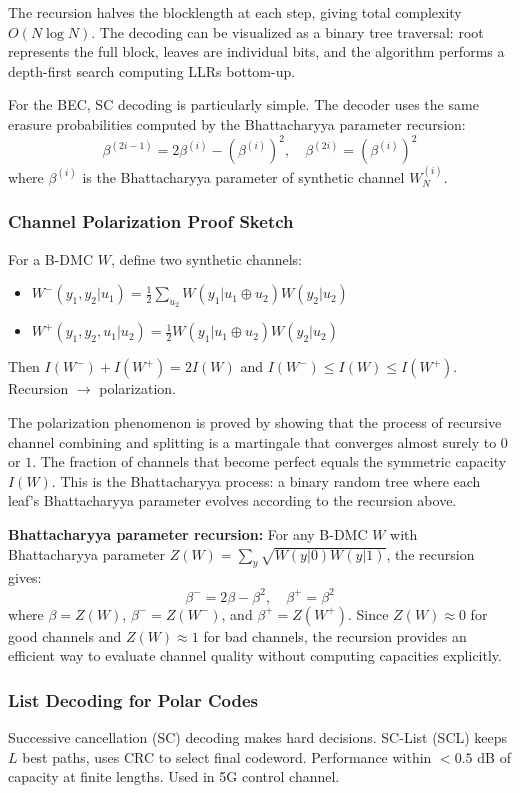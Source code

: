 The recursion halves the blocklength at each step, giving total complexity $O(N \log N)$. The decoding can be visualized as a binary tree traversal: root represents the full block, leaves are individual bits, and the algorithm performs a depth-first search computing LLRs bottom-up.

For the BEC, SC decoding is particularly simple. The decoder uses the same erasure probabilities computed by the Bhattacharyya parameter recursion:
\[
\beta^{(2i-1)} = 2\beta^{(i)} - (\beta^{(i)})^2,\quad
\beta^{(2i)} = (\beta^{(i)})^2
\]
where $\beta^{(i)}$ is the Bhattacharyya parameter of synthetic channel $W_N^{(i)}$.

\subsubsection*{Channel Polarization Proof Sketch}
For a B-DMC $W$, define two synthetic channels:
\begin{itemize}
\item $W^-(y_1,y_2|u_1) = \frac{1}{2} \sum_{u_2} W(y_1|u_1 \oplus u_2) W(y_2|u_2)$
\item $W^+(y_1,y_2,u_1|u_2) = \frac{1}{2} W(y_1|u_1 \oplus u_2) W(y_2|u_2)$
\end{itemize}
Then $I(W^-) + I(W^+) = 2I(W)$ and $I(W^-) \le I(W) \le I(W^+)$. Recursion $\to$ polarization.

The polarization phenomenon is proved by showing that the process of recursive channel combining and splitting is a martingale that converges almost surely to $0$ or $1$. The fraction of channels that become perfect equals the symmetric capacity $I(W)$. This is the Bhattacharyya process: a binary random tree where each leaf's Bhattacharyya parameter evolves according to the recursion above.

\textbf{Bhattacharyya parameter recursion:} For any B-DMC $W$ with Bhattacharyya parameter $Z(W) = \sum_y \sqrt{W(y|0)W(y|1)}$, the recursion gives:
\[
\beta^{-} = 2\beta - \beta^2,\quad \beta^{+} = \beta^2
\]
where $\beta = Z(W)$, $\beta^{-} = Z(W^-)$, and $\beta^{+} = Z(W^+)$. Since $Z(W) \approx 0$ for good channels and $Z(W) \approx 1$ for bad channels, the recursion provides an efficient way to evaluate channel quality without computing capacities explicitly.

\subsubsection*{List Decoding for Polar Codes}
Successive cancellation (SC) decoding makes hard decisions. SC-List (SCL) keeps $L$ best paths, uses CRC to select final codeword. Performance within $<0.5$ dB of capacity at finite lengths. Used in 5G control channel.

